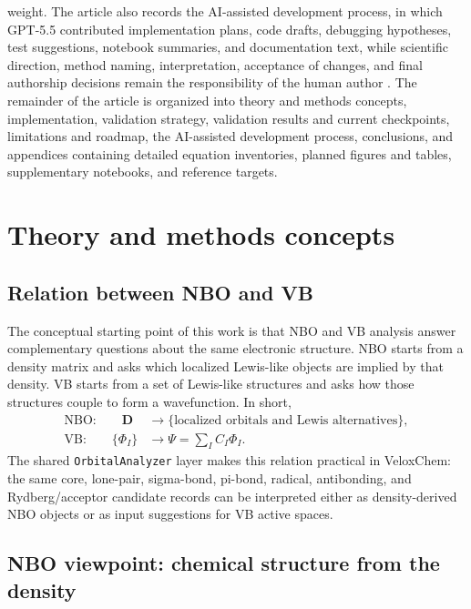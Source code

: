 \documentclass[11pt]{article}
\newcommand{\dens}{\mathbf{D}}
\begin{document}
weight.  The article also records the AI-assisted development process, in which GPT-5.5 contributed implementation plans, code drafts, debugging hypotheses, test suggestions, notebook summaries, and documentation text, while scientific direction, method naming, interpretation, acceptance of changes, and final authorship decisions remain the responsibility of the human author \cite{AITransparencyGuidance}.  The remainder of the article is organized into theory and methods concepts, implementation, validation strategy, validation results and current checkpoints, limitations and roadmap, the AI-assisted development process, conclusions, and appendices containing detailed equation inventories, planned figures and tables, supplementary notebooks, and reference targets.

\section{Theory and methods concepts}

\subsection*{Relation between NBO and VB}
The conceptual starting point of this work is that NBO and VB analysis answer complementary questions about the same electronic structure.  NBO starts from a density matrix and asks which localized Lewis-like objects are implied by that density.  VB starts from a set of Lewis-like structures and asks how those structures couple to form a wavefunction.  In short,
\begin{equation}
\begin{aligned}
	\text{NBO:} \qquad
	\dens &\longrightarrow \{\text{localized orbitals and Lewis alternatives}\}, \\
	\text{VB:} \qquad
	\{\Phi_I\} &\longrightarrow \Psi = \sum_I C_I \Phi_I.
\end{aligned}
\end{equation}
The shared \texttt{OrbitalAnalyzer} layer makes this relation practical in VeloxChem: the same core, lone-pair, sigma-bond, pi-bond, radical, antibonding, and Rydberg/acceptor candidate records can be interpreted either as density-derived NBO objects or as input suggestions for VB active spaces.

\subsection{NBO viewpoint: chemical structure from the density}
\end{document}
